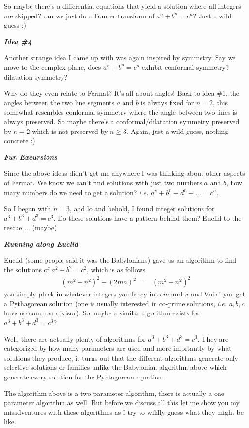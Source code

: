 \documentclass[aps,preprint,preprintnumbers,nofootinbib,showpacs,prd]{revtex4-1}
\newcommand{\ie}{{\it i.e.} }
\newcommand{\nbea}{\begin{eqnarray*}}
\newcommand{\neea}{\end{eqnarray*}}
\begin{document}
So maybe there's a differential equations that yield a solution where all integers are skipped? can we just do a Fourier transform of $a^n + b^n = c^n$? Just a wild guess :)

\bigskip\textbf{\textit{Idea \#4}}

Another strange idea I came up with was again inspired by symmetry. Say we move to the complex plane, does $a^n + b^n = c^n$ exhibit conformal symmetry? dilatation symmetry?

Why do they even relate to Fermat? It's all about angles! Back to idea \#1, the angles between the two line segments $a$ and $b$ is always fixed for $n=2$, this somewhat resembles conformal symmetry where the angle between two lines is always preserved. So maybe there's a conformal/dilatation symmetry preserved by $n=2$ which is not preserved by $n \ge 3$. Again, just a wild guess, nothing concrete :)

\bigskip\textbf{\textit{Fun Excursions}}

Since the above ideas didn't get me anywhere I was thinking about other aspects of Fermat. We know we can't find solutions with just two numbers $a$ and $b$, how many numbers do we need to get a solution? \ie $a^n + b^n  + d^n + \dots = c^n$.

So I began with $n=3$, and lo and behold, I found integer solutions for $a^3 + b^3  + d^3 = c^3$. Do these solutions have a pattern behind them? Euclid to the rescue $\dots$ (maybe)

\bigskip\textbf{\textit{Running along Euclid}}

Euclid (some people said it was the Babylonians) gave us an algorithm to find the solutions of $a^2 + b^2 = c^2$, which is as follows
%
\nbea
(m^2 - n^2)^2 + (2mn)^2 & = & (m^2 + n^2)^2
\neea
%
you simply pluck in whatever integers you fancy into $m$ and $n$ and Voila! you get a Pythagorean solution (one is usually interested in co-prime solutions, \ie $a,b,c$ have no common divisor). So maybe a similar algorithm exists for $a^3 + b^3  + d^3 = c^3$?

Well, there are actually plenty of algorithms for $a^3 + b^3  + d^3 = c^3$. They are categorized by how many parameters are used and more imprtantly by what solutions they produce, it turns out that the different algorithms generate only selective solutions or families unlike the Babylonian algorithm above which generate every solution for the Pyhtagorean equation.

The algorithm above is a two parameter algorithm, there is actually a one parameter algorithm as well. But before we discuss all this let me show you my misadventures with these algorithms as I try to wildly guess what they might be like.
\end{document}
